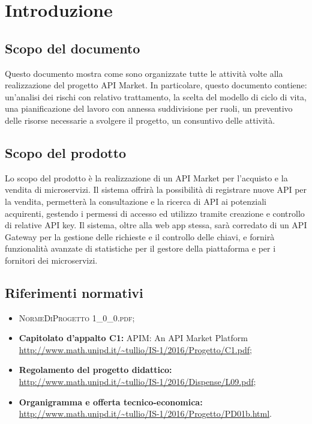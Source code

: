 \newpage
\section{Introduzione}

\subsection{Scopo del documento}
Questo documento mostra come sono organizzate tutte le attività volte alla realizzazione del progetto API Market. In particolare, questo documento contiene: un'analisi dei rischi con relativo trattamento, la scelta del modello di ciclo di vita, una pianificazione del lavoro con annessa suddivisione per ruoli, un preventivo delle risorse necessarie a svolgere il progetto, un consuntivo delle attività.

\subsection{Scopo del prodotto}
Lo scopo del prodotto è la realizzazione di un API Market per l'acquisto e la vendita di microservizi. Il sistema offrirà la possibilità di registrare nuove API per la vendita, permetterà la consultazione e la ricerca di API ai potenziali acquirenti, gestendo i permessi di accesso ed utilizzo tramite creazione e controllo di relative API key. Il sistema, oltre alla web app stessa, sarà corredato di un API Gateway per la gestione delle richieste e il controllo delle chiavi, e fornirà funzionalità avanzate di statistiche per il gestore della piattaforma e per i fornitori dei microservizi.

\subsection{Riferimenti normativi}
\begin{itemize}
\item \textsc{NormeDiProgetto 1\_0\_0.pdf};
\item \textbf{Capitolato d’appalto C1:} APIM: An API Market Platform\\ \url{http://www.math.unipd.it/~tullio/IS-1/2016/Progetto/C1.pdf};
\item \textbf{Regolamento del progetto didattico:}\\
\url{http://www.math.unipd.it/~tullio/IS-1/2016/Dispense/L09.pdf};
\item \textbf{Organigramma e offerta tecnico-economica:}\\
\url{http://www.math.unipd.it/~tullio/IS-1/2016/Progetto/PD01b.html}.
\end{itemize}

